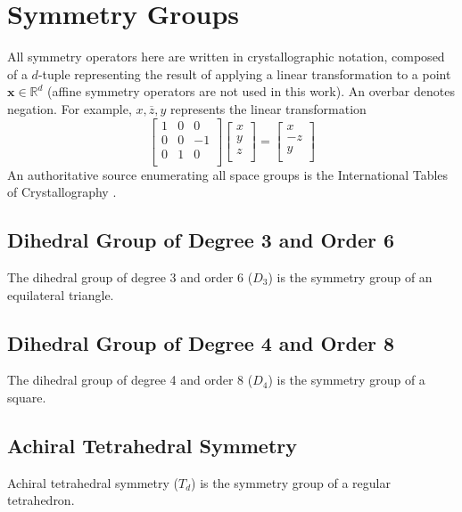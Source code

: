 \documentclass[acmtog]{acmart}
\begin{document}
\section{Symmetry Groups}
\label{sec:symmetry_groups}
All symmetry operators here are written in crystallographic notation, composed of a $d$-tuple representing the result of applying a linear transformation to a point $\mathbf{x} \in \mathbb{R}^d$ (affine symmetry operators are not used in this work). An overbar denotes negation. For example, $x, \overline{z}, y$ represents the linear transformation
\begin{equation}
  \begin{bmatrix}
    1 & 0 & 0 \\
    0 & 0 & -1 \\
    0 & 1 & 0 \\
  \end{bmatrix}
  \begin{bmatrix}
    x \\
    y \\
    z \\
  \end{bmatrix}
  =
  \begin{bmatrix}
    x \\
    -z \\
    y \\
  \end{bmatrix}
\end{equation}
An authoritative source enumerating all space groups is the International Tables of Crystallography \cite{aroyo2016}.

\subsection{Dihedral Group of Degree 3 and Order 6}
The dihedral group of degree 3 and order 6 ($D_3$) is the symmetry group of an equilateral triangle.

\subsection{Dihedral Group of Degree 4 and Order 8}
The dihedral group of degree 4 and order 8 ($D_4$) is the symmetry group of a square.

\subsection{Achiral Tetrahedral Symmetry}
Achiral tetrahedral symmetry ($T_d$) is the symmetry group of a regular tetrahedron.
\end{document}
